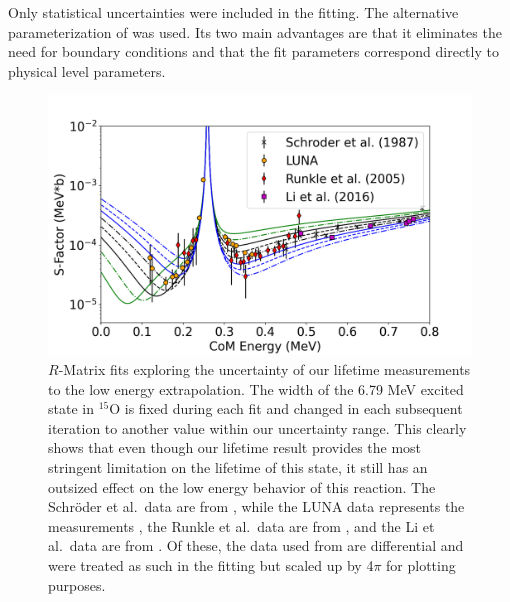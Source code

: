 Only statistical uncertainties were included in the fitting. The alternative parameterization of \citet{PhysRevC.66.044611} was used. Its two main advantages are that it eliminates the need for boundary conditions and that the fit parameters correspond directly to physical level parameters.



\begin{figure}[h!]
\includegraphics[width=1.0\linewidth]{./figures/lifetimeEffects.png}
\caption{$R$-Matrix fits exploring the uncertainty of our lifetime measurements to the low energy extrapolation. The width of the 6.79 MeV excited state in $^{15}$O is fixed during each fit and changed in each subsequent iteration to another value within our uncertainty range. This clearly shows that even though our lifetime result provides the most stringent limitation on the lifetime of this state, it still has an outsized effect on the low energy behavior of this reaction. The Schr{\"{o}}der et al.~data are from \cite{Schroder1987}, while the LUNA data represents the measurements \cite{Formicola2004, Imbriani2005, Marta2008, Marta2011}, the Runkle et al.~data are from \cite{Runkle2005}, and the Li et al.~data are from \cite{Li2016}. Of these, the data used from \citet{Li2016} are differential and were treated as such in the fitting but scaled up by 4$\pi$ for plotting purposes.}
\label{fig: rmatrixRange}
\end{figure}


